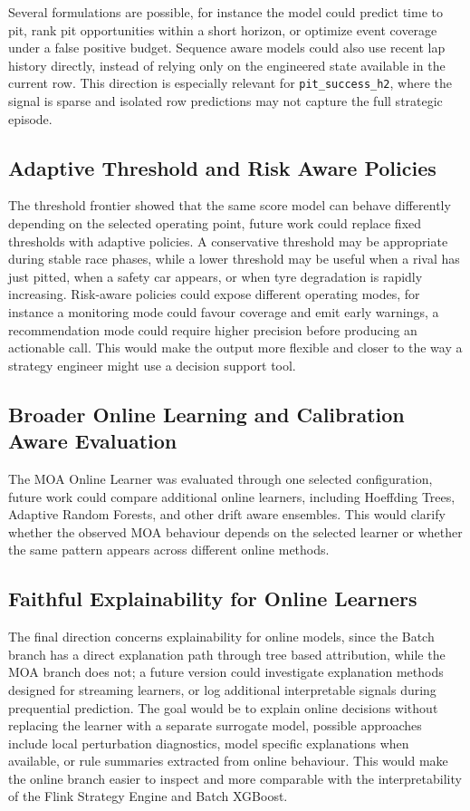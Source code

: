 Several formulations are possible, for instance the model could predict time to pit, rank pit opportunities within a short horizon, or optimize event coverage under a false positive
budget. Sequence aware models could also use recent lap history directly, instead of relying only on the engineered state available in the current row. This direction is
especially relevant for \texttt{pit\_success\_h2}, where the signal is sparse and isolated row predictions may not capture the full strategic episode.

\subsection{Adaptive Threshold and Risk Aware Policies}

The threshold frontier showed that the same score model can behave differently depending on the selected operating point, future work could replace fixed thresholds
with adaptive policies. A conservative threshold may be appropriate during stable race phases, while a lower threshold may be useful when a rival has just pitted, when
a safety car appears, or when tyre degradation is rapidly increasing.
Risk-aware policies could expose different operating modes, for instance a monitoring mode could favour coverage and emit early warnings, a recommendation mode could require higher
precision before producing an actionable call. This would make the output more flexible and closer to the way a strategy engineer might use a decision support tool.

\subsection{Broader Online Learning and Calibration Aware Evaluation}

The MOA Online Learner was evaluated through one selected configuration, future work could compare additional online learners, including Hoeffding Trees, Adaptive
Random Forests, and other drift aware ensembles. This would clarify whether the observed MOA behaviour depends on the selected learner or whether the same pattern
appears across different online methods.

\subsection{Faithful Explainability for Online Learners}

The final direction concerns explainability for online models, since the Batch branch has a direct explanation path through tree based attribution, while the MOA branch does not; a
future version could investigate explanation methods designed for streaming learners, or log additional interpretable signals during prequential prediction.
The goal would be to explain online decisions without replacing the learner with a separate surrogate model, possible approaches include local perturbation diagnostics,
model specific explanations when available, or rule summaries extracted from online behaviour. This would make the online branch easier to inspect and more comparable with
the interpretability of the Flink Strategy Engine and Batch XGBoost.

